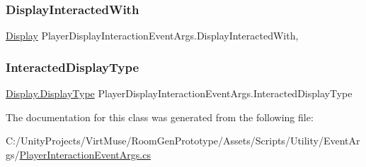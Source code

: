 \subsubsection{\texorpdfstring{Display\+Interacted\+With}{DisplayInteractedWith}}
{\footnotesize\ttfamily \mbox{\hyperlink{class_display}{Display}} Player\+Display\+Interaction\+Event\+Args.\+Display\+Interacted\+With\hspace{0.3cm}{\ttfamily [get]}, {}}

\mbox{\label{class_player_display_interaction_event_args_a535db31e6a8cae469787cb100f2a4ba6}} 
\subsubsection{\texorpdfstring{Interacted\+Display\+Type}{InteractedDisplayType}}
{\footnotesize\ttfamily \mbox{\hyperlink{class_display_a7f7abc559192ef7e8f4a03382d3492d7}{Display.\+Display\+Type}} Player\+Display\+Interaction\+Event\+Args.\+Interacted\+Display\+Type\hspace{0.3cm}{\ttfamily [get]}}



The documentation for this class was generated from the following file\+:\begin{DoxyCompactItemize}
\item 
C\+:/\+Unity\+Projects/\+Virt\+Muse/\+Room\+Gen\+Prototype/\+Assets/\+Scripts/\+Utility/\+Event\+Args/\mbox{\hyperlink{_player_interaction_event_args_8cs}{Player\+Interaction\+Event\+Args.\+cs}}\end{DoxyCompactItemize}
